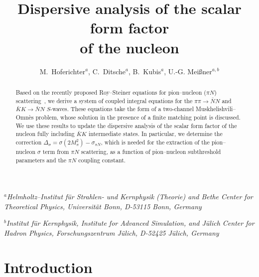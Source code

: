 \documentclass[11pt]{article}%
\newcommand{\mpi}{M_{\pi}}
\begin{document}
\setlength{\unitlength}{1mm}

\renewcommand{\arraystretch}{1.2}



\author{M.~Hoferichter$^a$, C.~Ditsche$^a$, B.~Kubis$^a$, U.-G. Mei\ss ner$^{a,b}$}

\title{\bf Dispersive analysis of the scalar form factor\\ of the nucleon}

\date{}

\maketitle

\begin{center}
{\small
$^a${\it Helmholtz--Institut f\"ur Strahlen- und Kernphysik (Theorie) 
   and Bethe Center for Theoretical Physics, Universit\"at Bonn, D-53115 Bonn, Germany}

\bigskip

$^b${\it Institut f\"ur Kernphysik, Institute for Advanced Simulation, 
   and J\"ulich Center for Hadron Physics, Forschungszentrum J\"ulich, D-52425  J\"ulich, Germany}
}
\bigskip
\end{center}


\begin{abstract}
 Based on the recently proposed Roy--Steiner equations for pion--nucleon ($\pi N$) scattering~\cite{RS_DHKM}, we derive a system of coupled integral equations for the $\pi\pi\to\bar N N$ and $\bar K K\to\bar N N$ $S$-waves. These equations take the form of a two-channel Muskhelishvili--Omn\`es problem, whose solution in the presence of a finite matching point is discussed. We use these results to update the dispersive analysis of the scalar form factor of the nucleon fully including $\bar K K$ intermediate states. In particular, we determine the correction $\Delta_\sigma=\sigma(2\mpi^2)-\sigma_{\pi N}$, which is needed for the extraction of the pion--nucleon $\sigma$ term from $\pi N$ scattering, as a function of pion--nucleon subthreshold parameters and the $\pi N$ coupling constant. 
\end{abstract}



\section{Introduction}
\end{document}
